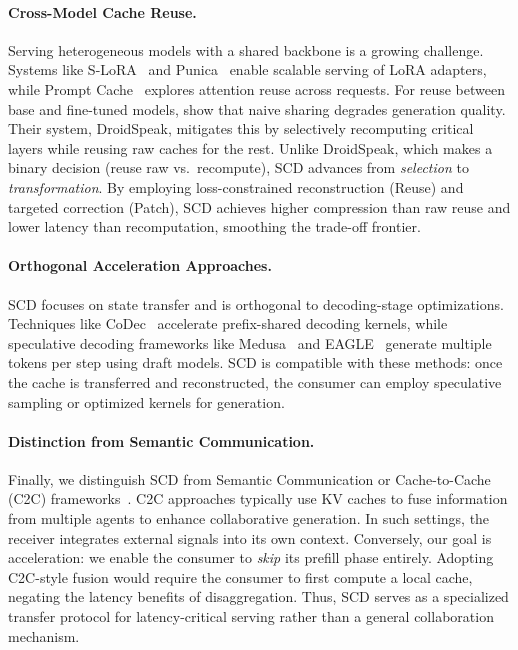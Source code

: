 \documentclass{article}
\theoremstyle{plain}
\theoremstyle{definition}
\theoremstyle{remark}
\begin{document}
\paragraph{Cross-Model Cache Reuse.}
Serving heterogeneous models with a shared backbone is a growing challenge.
Systems like S-LoRA~\citep{sheng2024slora} and Punica~\citep{chen2024punica} enable scalable serving of LoRA adapters, while Prompt Cache~\citep{gim2024prompt} explores attention reuse across requests.
For reuse between base and fine-tuned models, \citet{liu2024droidspeak} show that naive sharing degrades generation quality.
Their system, DroidSpeak, mitigates this by selectively recomputing critical layers while reusing raw caches for the rest.
Unlike DroidSpeak, which makes a binary decision (reuse raw vs.\ recompute), SCD advances from \emph{selection} to \emph{transformation}.
By employing loss-constrained reconstruction (Reuse) and targeted correction (Patch), SCD achieves higher compression than raw reuse and lower latency than recomputation, smoothing the trade-off frontier.

\paragraph{Orthogonal Acceleration Approaches.}
SCD focuses on state transfer and is orthogonal to decoding-stage optimizations.
Techniques like CoDec~\citep{wang2025codec} accelerate prefix-shared decoding kernels, while speculative decoding frameworks like Medusa~\citep{cai2024medusa} and EAGLE~\citep{li2024eagle} generate multiple tokens per step using draft models.
SCD is compatible with these methods: once the cache is transferred and reconstructed, the consumer can employ speculative sampling or optimized kernels for generation.

\paragraph{Distinction from Semantic Communication.}
Finally, we distinguish SCD from Semantic Communication or Cache-to-Cache (C2C) frameworks~\citep{fu2026c2c}.
C2C approaches typically use KV caches to fuse information from multiple agents to enhance collaborative generation.
In such settings, the receiver integrates external signals into its own context.
Conversely, our goal is acceleration: we enable the consumer to \emph{skip} its prefill phase entirely.
Adopting C2C-style fusion would require the consumer to first compute a local cache, negating the latency benefits of disaggregation.
Thus, SCD serves as a specialized transfer protocol for latency-critical serving rather than a general collaboration mechanism.
\end{document}
